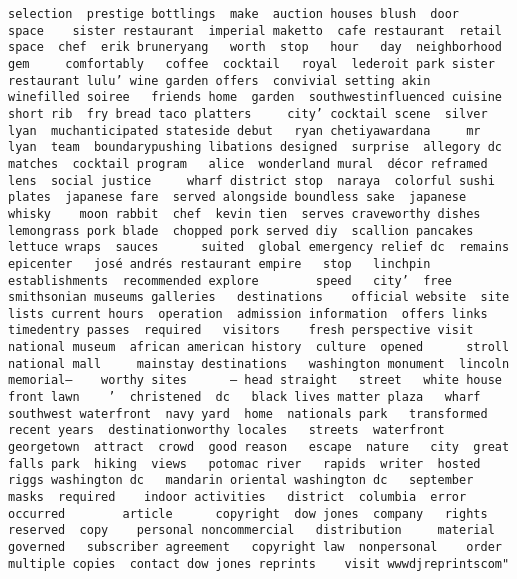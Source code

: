 \documentclass[
]{article}
\begin{document}
\begin{verbatim}
selection  prestige bottlings  make  auction houses blush  door   space    sister restaurant  imperial maketto  cafe restaurant  retail space  chef  erik bruneryang   worth  stop   hour   day  neighborhood gem     comfortably   coffee  cocktail   royal  lederoit park sister restaurant lulu’ wine garden offers  convivial setting akin   winefilled soiree   friends home  garden  southwestinfluenced cuisine   short rib  fry bread taco platters     city’ cocktail scene  silver lyan  muchanticipated stateside debut   ryan chetiyawardana     mr lyan  team  boundarypushing libations designed  surprise  allegory dc  matches  cocktail program   alice  wonderland mural  décor reframed   lens  social justice     wharf district stop  naraya  colorful sushi plates  japanese fare  served alongside boundless sake  japanese whisky    moon rabbit  chef  kevin tien  serves craveworthy dishes   lemongrass pork blade  chopped pork served diy  scallion pancakes lettuce wraps  sauces      suited  global emergency relief dc  remains  epicenter   josé andrés restaurant empire   stop   linchpin establishments  recommended explore        speed   city’  free smithsonian museums galleries   destinations    official website  site lists current hours  operation  admission information  offers links  timedentry passes  required   visitors    fresh perspective visit  national museum  african american history  culture  opened      stroll   national mall     mainstay destinations   washington monument  lincoln memorial—    worthy sites      — head straight   street   white house front lawn    ’  christened  dc   black lives matter plaza   wharf   southwest waterfront  navy yard  home  nationals park   transformed  recent years  destinationworthy locales   streets  waterfront  georgetown  attract  crowd  good reason   escape  nature   city  great falls park  hiking  views   potomac river   rapids  writer  hosted  riggs washington dc   mandarin oriental washington dc   september  masks  required    indoor activities   district  columbia  error  occurred        article      copyright  dow jones  company   rights reserved  copy    personal noncommercial   distribution     material  governed   subscriber agreement   copyright law  nonpersonal    order multiple copies  contact dow jones reprints    visit wwwdjreprintscom"                                                                                                                                                                                                                                                                                                                                                                                                                                                                                                                                                                                                                                                                                                                                                                                                                                                                                                                                                                                                                                      
\end{verbatim}
\end{document}
